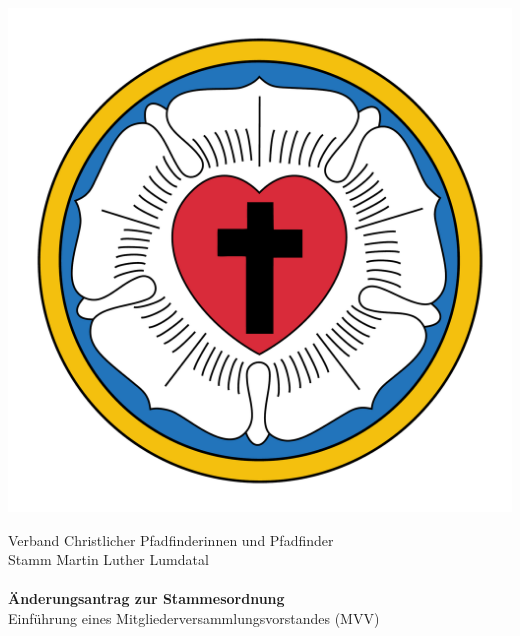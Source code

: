 \documentclass[a4paper]{article}
\begin{document}
\begin{center}
    \begin{minipage}{.2\textwidth}
        \flushleft
        \includegraphics[width=1\linewidth]{Lutherrose.pdf}
    \end{minipage}%
    \begin{minipage}{.6\textwidth}
        \begin{center}
            \footnotesize Verband Christlicher Pfadfinderinnen und Pfadfinder\\
            \large Stamm Martin Luther Lumdatal\\
            ~\\
            \Large \textbf{Änderungsantrag zur Stammesordnung}\\
            \normalsize Einführung eines Mitgliederversammlungsvorstandes (MVV)\\
            ~\\
        \end{center}
    \end{minipage}%
    \begin{minipage}{.2\textwidth}
        \flushright

\end{minipage}
\end{center}
\end{document}
